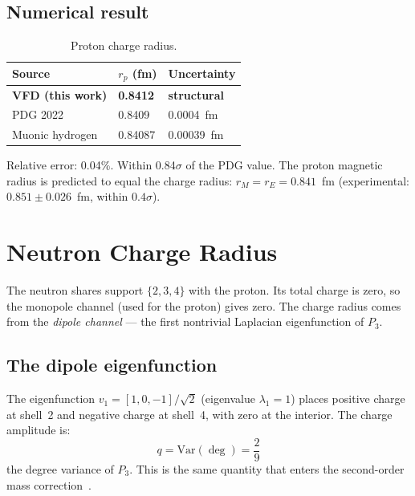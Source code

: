 \documentclass[12pt]{article}
\begin{document}
\subsection{Numerical result}

\begin{table}[ht]
\centering
\caption{Proton charge radius.}
\label{tab:proton}
\begin{tabular}{@{}lll@{}}
\toprule
Source & $r_p$ (fm) & Uncertainty \\
\midrule
\textbf{VFD (this work)} & \textbf{0.8412} & \textbf{structural} \\
PDG 2022 & 0.8409 & 0.0004~fm \\
Muonic hydrogen & 0.84087 & 0.00039~fm \\
\bottomrule
\end{tabular}
\end{table}

\noindent Relative error: 0.04\%. Within 0.84$\sigma$ of the PDG value. The proton magnetic radius is predicted to equal the charge radius: $r_M = r_E = 0.841$~fm (experimental: $0.851 \pm 0.026$~fm, within $0.4\sigma$).

\section{Neutron Charge Radius}\label{sec:neutron}

The neutron shares support $\{2,3,4\}$ with the proton. Its total charge is zero, so the monopole channel (used for the proton) gives zero. The charge radius comes from the \textit{dipole channel} --- the first nontrivial Laplacian eigenfunction of $P_3$.

\subsection{The dipole eigenfunction}

The eigenfunction $v_1 = [1, 0, -1]/\sqrt{2}$ (eigenvalue $\lambda_1 = 1$) places positive charge at shell~2 and negative charge at shell~4, with zero at the interior. The charge amplitude is:
\begin{equation}
    q = \mathrm{Var}(\deg) = \frac{2}{9}
\end{equation}
the degree variance of $P_3$. This is the same quantity that enters the second-order mass correction~\citep{SmartIV}.
\end{document}
